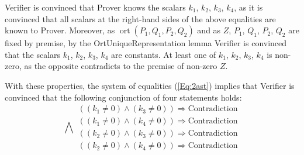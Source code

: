 \documentclass{mathcryptology} %
\DeclareMathOperator{\ort}{ort}
\theoremstyle{title}
\theoremstyle{titleof}
\renewenvironment{proof}{\noindent{\bfseries Proof:} }{}
\begin{document}
\begin{proof}
        Verifier is convinced that Prover knows the scalars $k_{1}$, $k_{2}$, $k_{3}$, $k_{4}$, as it is convinced that all scalars at the right-hand sides of the above equalities are known to Prover. Moreover, as $\ort\left(P_{1}, Q_{1}, P_{2}, Q_{2}\right)$ and as $Z$, $P_{1}$, $Q_{1}$, $P_{2}$, $Q_{2}$ are fixed by premise, by the OrtUniqueRepresentation lemma Verifier is convinced that the scalars $k_{1}$, $k_{2}$, $k_{3}$, $k_{4}$ are constants. 
        At least one of $k_{1}$, $k_{2}$, $k_{3}$, $k_{4}$ is non-zero, as the opposite contradicts to the premise of non-zero $Z$. 
        
        With these properties, the system of equalities (\ref{Eq:2ast}\label{**}) implies that Verifier is convinced that the following conjunction of four statements holds: 
        \begin{equation}
            \left. \bm{\bigwedge}
            \begin{array}{l}\label{Eq:3ast}\tag{***}
            ((k_{1} \neq0) \wedge (k_{3} \neq0)) \Rightarrow \text{Contradiction} \\
            ((k_{1} \neq0) \wedge (k_{4} \neq0)) \Rightarrow \text{Contradiction} \\
            ((k_{2} \neq0) \wedge (k_{3} \neq0)) \Rightarrow \text{Contradiction} \\
            ((k_{2} \neq0) \wedge (k_{4} \neq0)) \Rightarrow \text{Contradiction}
        \end{array}\right.
        \end{equation}        
        

\end{proof}
\end{document}
